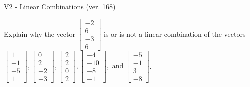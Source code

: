\begin{exercise}
  \begin{exerciseTitle}V2 - Linear Combinations (ver. 168)\end{exerciseTitle}
  \begin{exerciseStatement}
    Explain why the vector \(\left[\begin{array}{c}
-2 \\
6 \\
-3 \\
6
\end{array}\right]\)  is or is not a linear 
	combination of the vectors \(\left[\begin{array}{c}
1 \\
-1 \\
-5 \\
1
\end{array}\right] , \left[\begin{array}{c}
0 \\
2 \\
-2 \\
-3
\end{array}\right] , \left[\begin{array}{c}
2 \\
2 \\
0 \\
2
\end{array}\right] , \left[\begin{array}{c}
-4 \\
-10 \\
-8 \\
-1
\end{array}\right] , \text{ and } \left[\begin{array}{c}
-5 \\
-1 \\
3 \\
-8
\end{array}\right]\).
	



\end{exerciseStatement}
\end{exercise}
